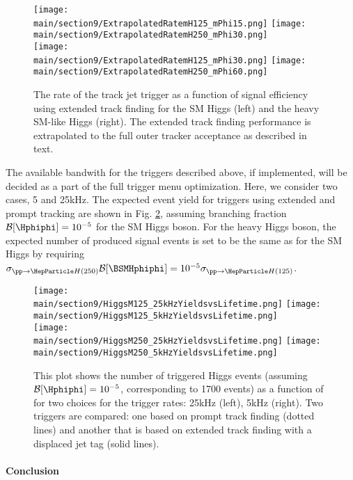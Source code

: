 \begin{figure}[hbtp]
  \centering
    \texttt{[image: \\main/section9/ExtrapolatedRatemH125\_mPhi15.png]}
    \texttt{[image: \\main/section9/ExtrapolatedRatemH250\_mPhi30.png]}\\
    \texttt{[image: \\main/section9/ExtrapolatedRatemH125\_mPhi30.png]}
    \texttt{[image: \\main/section9/ExtrapolatedRatemH250\_mPhi60.png]}
    \caption{The rate of the track jet \HT trigger as a function of signal efficiency using extended track finding for the SM Higgs (left)
    and the heavy SM-like Higgs (right). The extended track finding performance is extrapolated to the full outer tracker acceptance as described in text.}
    \label{fig:reff_dispextra}
\end{figure}

The available bandwith for the triggers described above, if implemented, will be decided as a part of the full trigger menu optimization.
Here, we consider two cases, 5 and 25\unit{kHz}. The expected event yield for triggers using extended and prompt tracking are shown in Fig. \ref{fig:money},
assuming branching fraction $\mathcal{B}[\Hphiphi] = 10^{-5}$ for the SM Higgs boson.
For the heavy Higgs boson, the expected number of produced signal events is set to be the same as for the SM Higgs by requiring
$\sigma_{\pp\to \PH(250)} \mathcal{B}[\BSMHphiphi] = 10^{-5} \sigma_{\pp\to \PH(125)}$.

\begin{figure}[hbtp]
  \centering
    \texttt{[image: \\main/section9/HiggsM125\_25kHzYieldsvsLifetime.png]}
    \texttt{[image: \\main/section9/HiggsM125\_5kHzYieldsvsLifetime.png]}\\
    \texttt{[image: \\main/section9/HiggsM250\_25kHzYieldsvsLifetime.png]}
    \texttt{[image: \\main/section9/HiggsM250\_5kHzYieldsvsLifetime.png]}
    \caption{This plot shows the number of triggered Higgs events (assuming ${\mathcal{B}[\Hphiphi] = 10^{-5}}$, corresponding to 
1700 events) as a function of \ctau for two choices for the trigger rates: 25\unit{kHz} (left), 5\unit{kHz} (right).
Two triggers are compared: one based on prompt track finding (dotted lines) and another that is based on extended track finding 
with a displaced jet tag (solid lines). }
    \label{fig:money}
\end{figure}

\paragraph{Conclusion}

